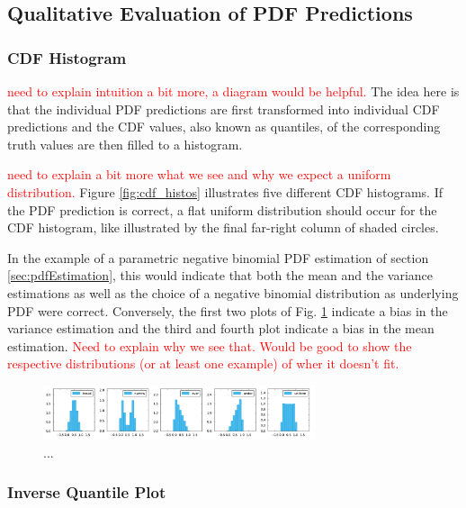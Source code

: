 \documentclass[BCOR=1mm, DIV=calc,10pt,
twoside=true,
twocolumn,
headings=normal]{scrartcl}
\newcommand{\fig}{Fig. }
\begin{document}
\subsection{Qualitative Evaluation of PDF Predictions}

\subsubsection{CDF Histogram}
\label{sec:cdf_histo}

\textcolor{red}{need to explain intuition a bit more, a diagram would be helpful.}
The idea here is that the individual PDF predictions are first transformed into individual
CDF predictions and the CDF values, also known as quantiles, of the corresponding truth
values are then filled to a histogram.

\textcolor{red}{need to explain a bit more what we see and why we expect a uniform distribution.}
Figure \eqref{fig:cdf_histos} illustrates five different CDF histograms. If the PDF
prediction is correct, a flat uniform distribution should occur for the CDF histogram,
like illustrated by the final far-right column of shaded circles.

In the example of a parametric negative binomial PDF estimation of section
\eqref{sec:pdfEstimation}, this would indicate that both the mean and the variance
estimations as well as the choice of a negative binomial distribution as underlying PDF
were correct. Conversely, the first two plots of \fig \ref{fig:cdf_histos} indicate a
bias in the variance estimation and the third and fourth plot indicate a bias in the mean
estimation.
\textcolor{red}{Need to explain why we see that. Would be good to show the respective distributions
(or at least one example) of wher it doesn't fit.}

\begin{figure}
\begin{center}
\includegraphics[width=8cm]{../figures/cdf_histos}
\caption{\label{fig:cdf_histos} ...}
\end{center}
\end{figure}

\subsubsection{Inverse Quantile Plot}
\end{document}
